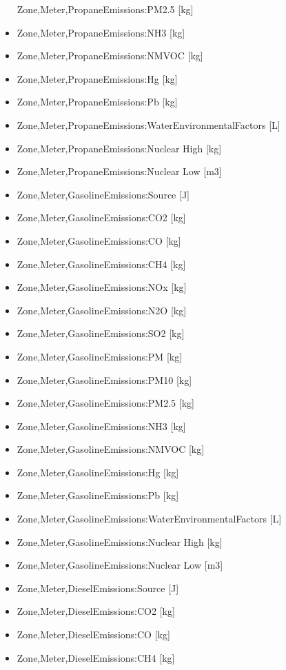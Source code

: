 \begin{itemize}
  Zone,Meter,PropaneEmissions:PM2.5 {[}kg{]}
\item
  Zone,Meter,PropaneEmissions:NH3 {[}kg{]}
\item
  Zone,Meter,PropaneEmissions:NMVOC {[}kg{]}
\item
  Zone,Meter,PropaneEmissions:Hg {[}kg{]}
\item
  Zone,Meter,PropaneEmissions:Pb {[}kg{]}
\item
  Zone,Meter,PropaneEmissions:WaterEnvironmentalFactors {[}L{]}
\item
  Zone,Meter,PropaneEmissions:Nuclear High {[}kg{]}
\item
  Zone,Meter,PropaneEmissions:Nuclear Low {[}m3{]}
\item
  Zone,Meter,GasolineEmissions:Source {[}J{]}
\item
  Zone,Meter,GasolineEmissions:CO2 {[}kg{]}
\item
  Zone,Meter,GasolineEmissions:CO {[}kg{]}
\item
  Zone,Meter,GasolineEmissions:CH4 {[}kg{]}
\item
  Zone,Meter,GasolineEmissions:NOx {[}kg{]}
\item
  Zone,Meter,GasolineEmissions:N2O {[}kg{]}
\item
  Zone,Meter,GasolineEmissions:SO2 {[}kg{]}
\item
  Zone,Meter,GasolineEmissions:PM {[}kg{]}
\item
  Zone,Meter,GasolineEmissions:PM10 {[}kg{]}
\item
  Zone,Meter,GasolineEmissions:PM2.5 {[}kg{]}
\item
  Zone,Meter,GasolineEmissions:NH3 {[}kg{]}
\item
  Zone,Meter,GasolineEmissions:NMVOC {[}kg{]}
\item
  Zone,Meter,GasolineEmissions:Hg {[}kg{]}
\item
  Zone,Meter,GasolineEmissions:Pb {[}kg{]}
\item
  Zone,Meter,GasolineEmissions:WaterEnvironmentalFactors {[}L{]}
\item
  Zone,Meter,GasolineEmissions:Nuclear High {[}kg{]}
\item
  Zone,Meter,GasolineEmissions:Nuclear Low {[}m3{]}
\item
  Zone,Meter,DieselEmissions:Source {[}J{]}
\item
  Zone,Meter,DieselEmissions:CO2 {[}kg{]}
\item
  Zone,Meter,DieselEmissions:CO {[}kg{]}
\item
  Zone,Meter,DieselEmissions:CH4 {[}kg{]}

\end{itemize}
